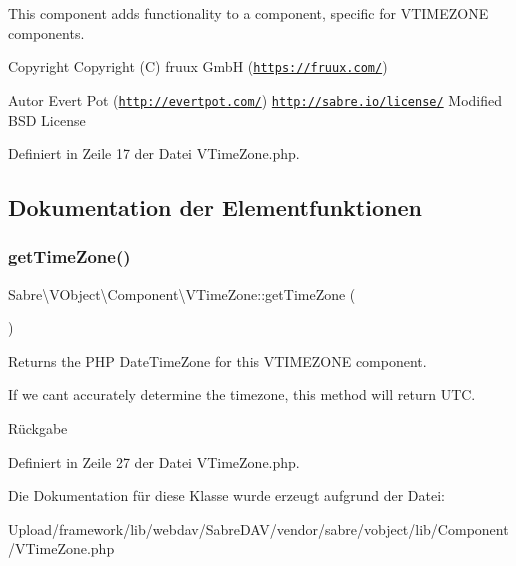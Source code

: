 This component adds functionality to a component, specific for V\+T\+I\+M\+E\+Z\+O\+NE components.

\begin{DoxyCopyright}{Copyright}
Copyright (C) fruux GmbH (\href{https://fruux.com/}{\tt https\+://fruux.\+com/}) 
\end{DoxyCopyright}
\begin{DoxyAuthor}{Autor}
Evert Pot (\href{http://evertpot.com/}{\tt http\+://evertpot.\+com/})  \href{http://sabre.io/license/}{\tt http\+://sabre.\+io/license/} Modified B\+SD License 
\end{DoxyAuthor}


Definiert in Zeile 17 der Datei V\+Time\+Zone.\+php.



\subsection{Dokumentation der Elementfunktionen}
\mbox{\label{class_sabre_1_1_v_object_1_1_component_1_1_v_time_zone_a86124647028fa220acf46e371b1f9cd8}} 
\subsubsection{\texorpdfstring{get\+Time\+Zone()}{getTimeZone()}}
{\footnotesize\ttfamily Sabre\textbackslash{}\+V\+Object\textbackslash{}\+Component\textbackslash{}\+V\+Time\+Zone\+::get\+Time\+Zone (\begin{DoxyParamCaption}{ }\end{DoxyParamCaption})}

Returns the P\+HP Date\+Time\+Zone for this V\+T\+I\+M\+E\+Z\+O\+NE component.

If we can\textquotesingle{}t accurately determine the timezone, this method will return U\+TC.

\begin{DoxyReturn}{Rückgabe}

\end{DoxyReturn}


Definiert in Zeile 27 der Datei V\+Time\+Zone.\+php.



Die Dokumentation für diese Klasse wurde erzeugt aufgrund der Datei\+:\begin{DoxyCompactItemize}
\item 
Upload/framework/lib/webdav/\+Sabre\+D\+A\+V/vendor/sabre/vobject/lib/\+Component/V\+Time\+Zone.\+php\end{DoxyCompactItemize}
